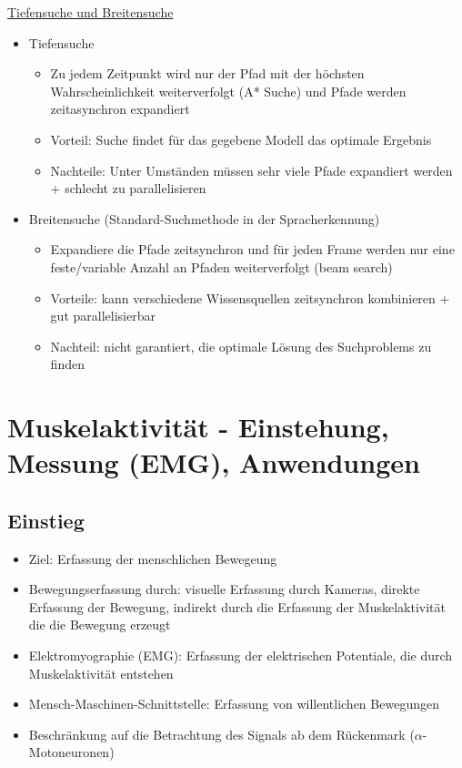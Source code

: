 \documentclass[a4paper,10pt,oneside]{article}
\begin{document}
\underline{Tiefensuche und Breitensuche} \\
	\begin{itemize}
		\item Tiefensuche
			\begin{itemize}
				\item Zu jedem Zeitpunkt wird nur der Pfad mit der höchsten Wahrscheinlichkeit weiterverfolgt (A* Suche) und Pfade werden zeitasynchron expandiert
				\item Vorteil: Suche findet für das gegebene Modell das optimale Ergebnis
				\item Nachteile: Unter Umständen müssen sehr viele Pfade expandiert werden + schlecht zu parallelisieren
			\end{itemize}
		\item Breitensuche (Standard-Suchmethode in der Spracherkennung)
			\begin{itemize}
				\item Expandiere die Pfade zeitsynchron und für jeden Frame werden nur eine feste/variable Anzahl an Pfaden weiterverfolgt (beam search)
				\item Vorteile: kann verschiedene Wissensquellen zeitsynchron kombinieren + gut parallelisierbar
				\item Nachteil: nicht garantiert, die optimale Lösung des Suchproblems zu finden
			\end{itemize}
	\end{itemize}
 

\section{Muskelaktivität - Einstehung, Messung (EMG), Anwendungen}
\subsection{Einstieg}

\begin{itemize}
	\item Ziel: Erfassung der menschlichen Bewegeung 
	\item Bewegungserfassung durch: visuelle Erfassung durch Kameras, direkte Erfassung der Bewegung, indirekt durch die Erfassung der Muskelaktivität die die Bewegung erzeugt
	\item Elektromyographie (EMG): Erfassung der elektrischen Potentiale, die durch Muskelaktivität entstehen
	\item Mensch-Maschinen-Schnittstelle: Erfassung von willentlichen Bewegungen
	\item Beschränkung auf die Betrachtung des Signals ab dem Rückenmark ($\alpha$-Motoneuronen)
\end{itemize}
\end{document}
